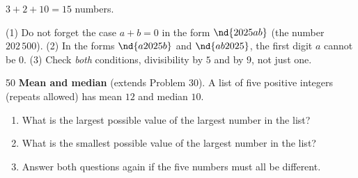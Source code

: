 {
$3+2+10=15$ numbers.

\begin{warnbox}(1) Do not forget the case $a+b=0$ in the form $\nd{2025ab}$ (the number $202\,500$). (2) In the forms $\nd{a2025b}$ and $\nd{ab2025}$, the first digit $a$ cannot be $0$. (3) Check \emph{both} conditions, divisibility by $5$ and by $9$, not just one.\end{warnbox}

}

\begin{probbox}{50}{}
\textbf{Mean and median} (extends Problem 30). A list of five positive integers (repeats allowed) has mean $12$ and median $10$.
\begin{enumerate}[label=\alph*),leftmargin=1.6em,itemsep=1pt]
\item What is the largest possible value of the largest number in the list?
\item What is the smallest possible value of the largest number in the list?
\item Answer both questions again if the five numbers must all be different.
\end{enumerate}
\end{probbox}

